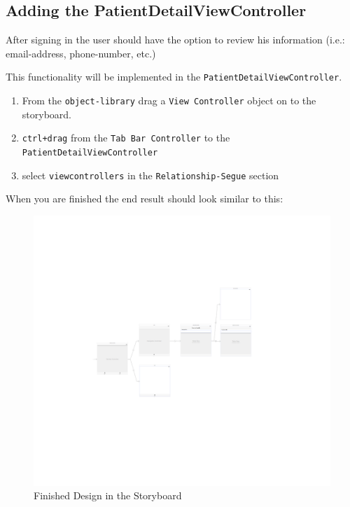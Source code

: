 \documentclass{article}
\begin{document}
\subsection{Adding the PatientDetailViewController}\label{adding-the-patientdetailviewcontroller}

After signing in the user should have the option to review his
information (i.e.: email-address, phone-number, etc.)

This functionality will be implemented in the
\texttt{PatientDetailViewController}.

\begin{enumerate}
\def\labelenumi{\arabic{enumi}.}

\item
  From the \texttt{object-library} drag a \texttt{View\ Controller}
  object on to the storyboard.
\item
  \texttt{ctrl+drag} from the \texttt{Tab\ Bar\ Controller} to the
  \texttt{PatientDetailViewController}
\item
  select \texttt{viewcontrollers} in the \texttt{Relationship-Segue}
  section
\end{enumerate}

When you are finished the end result should look similar to this:


\begin{figure}[H]
\centering
\includegraphics[width=\linewidth]{resources/step4/end-result.png}
\caption{Finished Design in the Storyboard}
\label{fig:storyboard-finished}
\end{figure}
\end{document}
